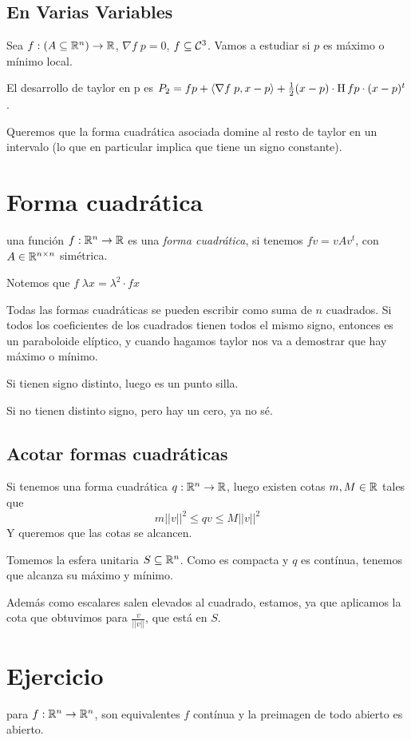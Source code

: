 \documentclass{article}
\begin{document}
\subsection*{En Varias Variables}
Sea $f : (A \subseteq \mathbb{R}^n) \to \mathbb{R}$, $\nabla f \; p = 0$, $f \subseteq \mathcal{C}^3$. Vamos a estudiar si $p$ es máximo o mínimo local.

El desarrollo de taylor en p es $P_2 = fp + \langle \nabla f \; p, x-p \rangle + \frac{1}{2} (x-p) \cdot \operatorname{H} f p \cdot (x-p)^t$.

Queremos que la forma cuadrática asociada domine al resto de taylor en un intervalo (lo que en particular implica que tiene un signo constante).

\section*{Forma cuadrática}
una función $f : \mathbb{R}^n \to \mathbb{R}$ es una \emph{forma cuadrática}, si tenemos $fv = vAv^t$, con $A \in \mathbb{R}^{n \times n}$ simétrica.

Notemos que $f \;\lambda x = \lambda^2 \cdot fx$

Todas las formas cuadráticas se pueden escribir como suma de $n$ cuadrados. Si todos los coeficientes de los cuadrados tienen todos el mismo signo, entonces es un paraboloide elíptico, y cuando hagamos taylor nos va a demostrar que hay máximo o mínimo.

Si tienen signo distinto, luego es un punto silla.

Si no tienen distinto signo, pero hay un cero, ya no sé.

\subsection*{Acotar formas cuadráticas}
Si tenemos una forma cuadrática $q : \mathbb{R}^n \to \mathbb{R}$, luego existen cotas $m, M \in \mathbb{R}$ tales que
\[
	m||v||^2 \leq qv \leq M||v||^2
\]
Y queremos que las cotas se alcancen.

Tomemos la esfera unitaria $S \subseteq \mathbb{R}^n$. Como es compacta y $q$ es contínua, tenemos que alcanza su máximo y mínimo.

Además como escalares salen elevados al cuadrado, estamos, ya que aplicamos la cota que obtuvimos para $\frac{v}{||v||}$, que está en $S$.

\section*{Ejercicio}
para $f : \mathbb{R}^n \to \mathbb{R}^n$, son equivalentes $f$ contínua y la preimagen de todo abierto es abierto.
\end{document}

